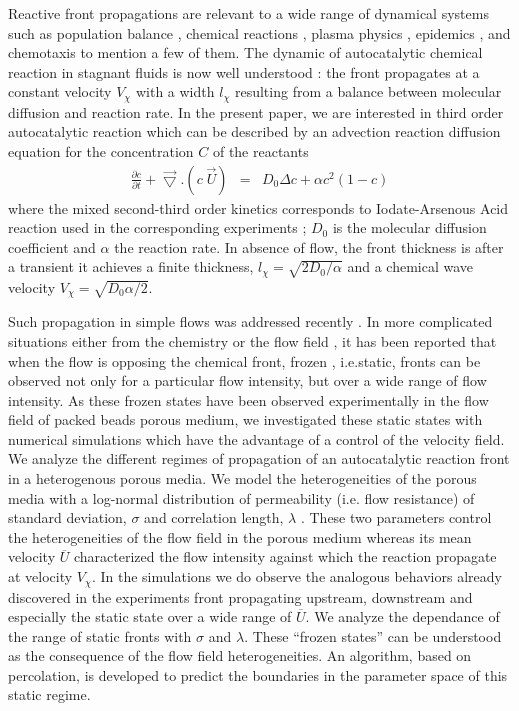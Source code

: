 \documentclass[doublecol]{epl2}
\begin{document}
Reactive front propagations are relevant to a wide range of dynamical systems such as population balance \cite{fisher37,kolmogoroff37}, chemical reactions \cite{scott94}, plasma physics \cite{beule98}, epidemics \cite{russell04}, and chemotaxis \cite{Adler66} to mention a few of them.
The dynamic of autocatalytic chemical  reaction in stagnant fluids is now well understood \cite{fisher37,kolmogoroff37,scott94}:
the front propagates at a constant velocity $V_{\chi}$ with a width $l_{\chi}$ resulting from a balance between molecular diffusion and reaction rate.
In the present paper, we are interested in third order autocatalytic reaction which can be described by an advection reaction diffusion equation for the concentration $C$ of the reactants
\begin{eqnarray}
  \frac{\partial c}{\partial t} + \vec{\bigtriangledown}.(c \; \vec{U}) & = & D_0 \Delta c + \alpha c^2(1 - c)
\label{pt_trans}
\end{eqnarray}
where the mixed second-third order kinetics corresponds to Iodate-Arsenous Acid reaction used in the corresponding experiments \cite{scott94,leconte03,atis12b}; $D_0$ is the molecular diffusion coefficient and $\alpha$ the reaction rate.
In absence of flow, the front thickness is after a transient it achieves a finite thickness, $l_\chi=\sqrt{2 D_0 / \alpha}$ and a chemical wave velocity $V_\chi = \sqrt{D_0 \alpha /2}$.

Such propagation in simple flows was addressed recently \cite{edwards02,leconte03}.
In more complicated situations either from the chemistry \cite{kaern02,koptyug08} or the flow field \cite{schwartz08,atis12,atis12b},
it has been reported that when the flow is opposing the chemical front, frozen , i.e.static, fronts can be observed not only for a particular flow intensity, but over a wide range of flow intensity. As these frozen states have been observed
experimentally in the flow field of packed beads porous medium, we investigated these static states with numerical simulations which have the advantage of a control of the velocity field.
We analyze the different regimes of propagation of an autocatalytic reaction front in a heterogenous porous media. We model the heterogeneities of the porous media with a log-normal distribution of permeability (i.e. flow resistance) of standard deviation, $\sigma$ and correlation length, $\lambda$ \cite{matheron67,talon03}.
These two parameters control the heterogeneities of the flow field in the porous medium whereas its mean velocity $\overline{U}$ characterized the flow intensity against which the reaction propagate at velocity $V_{\chi}$.  In the simulations we do observe the analogous behaviors already discovered in the experiments \cite{atis12,atis12b} front propagating upstream, downstream and especially the static state over a wide range of $\overline{U}$. We analyze the dependance of the range of static fronts
with $\sigma$ and $\lambda$.   These ``frozen states'' can be understood as the consequence of the flow field heterogeneities.
An algorithm, based on percolation, is developed  to predict the boundaries in the parameter space of this static regime.
\end{document}
